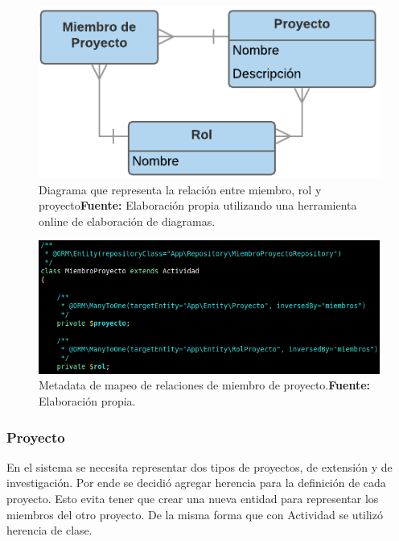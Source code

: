 \documentclass{article}
\begin{document}
\begin{figure}[h]
    \includegraphics[width=1\linewidth]{image/mpr-new.png}
    \caption{Diagrama que representa la relación entre miembro, rol y proyecto\newline \textbf{Fuente:} Elaboración propia utilizando una herramienta online de elaboración de diagramas.}
    \label{fig:image/mpr-new}
\end{figure}

\begin{figure}[h]
    \includegraphics[width=1\linewidth]{image/miembros.png}
    \caption{Metadata de mapeo de relaciones de miembro de proyecto.\newline \textbf{Fuente:} Elaboración propia.}
    \label{fig:image/miembros}
\end{figure}

\subsubsection{Proyecto}%
\label{ssub:modelo_proyecto}
En el sistema se necesita representar dos tipos de proyectos, de extensión y de investigación\@. Por ende se decidió agregar herencia para la definición de
cada proyecto\@. Esto evita tener que crear una nueva entidad para representar los miembros del otro proyecto\@. De la misma forma que con Actividad se utilizó
herencia de clase.
\end{document}
